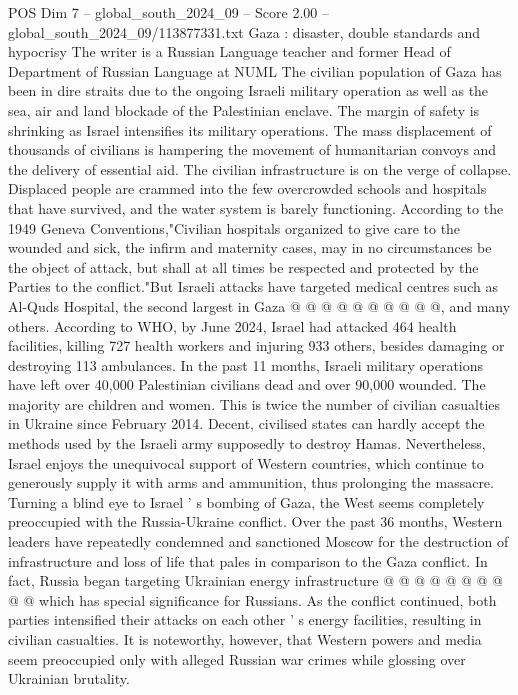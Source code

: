 \begin{textsample}{POS Dim 7 – global\_south\_2024\_09 – Score 2.00 – global\_south\_2024\_09/113877331.txt}  \label{ex:f7_pos_272}
Gaza : disaster, double standards and hypocrisy The writer is a Russian Language teacher and former Head of Department of Russian Language at NUML The civilian population of Gaza has been in dire straits due to the ongoing Israeli military operation as well as the sea, air and land blockade of the Palestinian enclave.
The margin of safety is shrinking as Israel intensifies its military operations.
The mass displacement of thousands of civilians is hampering the movement of humanitarian convoys and the delivery of essential aid.
The civilian infrastructure is on the verge of collapse.
Displaced people are crammed into the few overcrowded schools and hospitals that have survived, and the water system is barely functioning.
According to the 1949 Geneva Conventions,"Civilian hospitals organized to give care to the wounded and sick, the infirm and maternity cases, may in no circumstances be the object of attack, but shall at all times be respected and protected by the Parties to the conflict."But Israeli attacks have targeted medical centres such as Al-Quds Hospital, the second largest in Gaza @ @ @ @ @ @ @ @ @ @, and many others.
According to WHO, by June 2024, Israel had attacked 464 health facilities, killing 727 health workers and injuring 933 others, besides damaging or destroying 113 ambulances.
In the past 11 months, Israeli military operations have left over 40,000 Palestinian civilians dead and over 90,000 wounded.
The majority are children and women.
This is twice the number of civilian casualties in Ukraine since February 2014.
Decent, civilised states can hardly accept the methods used by the Israeli army supposedly to destroy Hamas.
Nevertheless, Israel enjoys the unequivocal support of Western countries, which continue to generously supply it with arms and ammunition, thus prolonging the massacre.
Turning a blind eye to Israel ' s bombing of Gaza, the West seems completely preoccupied with the Russia-Ukraine conflict.
Over the past 36 months, Western leaders have repeatedly condemned and sanctioned Moscow for the destruction of infrastructure and loss of life that pales in comparison to the Gaza conflict.
In fact, Russia began targeting Ukrainian energy infrastructure @ @ @ @ @ @ @ @ @ @ which has special significance for Russians.
As the conflict continued, both parties intensified their attacks on each other ' s energy facilities, resulting in civilian casualties.
It is noteworthy, however, that Western powers and media seem preoccupied only with alleged Russian war crimes while glossing over Ukrainian brutality.

\end{textsample}
